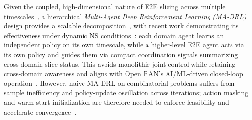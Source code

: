 \documentclass[12pt,lettersize,journal,onecolumn]{IEEEtran}
\begin{document}

Given the coupled, high-dimensional nature of E2E slicing across multiple timescales~\cite{comst24ebrahimi}, a hierarchical \textit{Multi-Agent Deep Reinforcement Learning (MA-DRL)} design provides a scalable decomposition~\cite{marl24albrecht}, with recent work demonstrating its effectiveness under dynamic NS conditions~\cite{tnsm24lu,mnet23liu}: each domain agent learns an independent policy on its own timescale, while a higher-level E2E agent acts via its own policy and guides them via compact coordination signals summarizing cross-domain slice status. This avoids monolithic joint control while retaining cross-domain awareness and aligns with Open RAN’s AI/ML-driven closed-loop operation~\cite{oran23architecture}. However, naive MA-DRL on combinatorial problems suffers from sample inefficiency and policy-update oscillation across iterations; action masking and warm-start initialization are therefore needed to enforce feasibility and accelerate convergence~\cite{marl24albrecht}.
\end{document}
